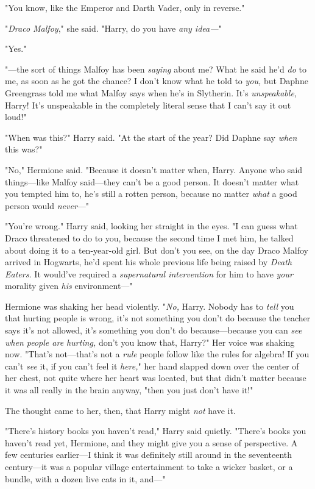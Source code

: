 "You know, like the Emperor and Darth Vader, only in reverse."

"\emph{Draco Malfoy}," she said. "Harry, do you have \emph{any idea---}"

"Yes."

"---the sort of things Malfoy has been \emph{saying} about me? What he said 
he'd \emph{do} to me, as soon as he got the chance? I don't know what he told 
to \emph{you,} but Daphne Greengrass told me what Malfoy says when he's in 
Slytherin. It's \emph{unspeakable,} Harry! It's unspeakable in the completely 
literal sense that I can't say it out loud!"

"When was this?" Harry said. "At the start of the year? Did Daphne say 
\emph{when} this was?"

"No," Hermione said. "Because it doesn't matter when, Harry. Anyone who said 
things---like Malfoy said---they can't be a good person. It doesn't matter what 
you tempted him to, he's still a rotten person, because no matter \emph{what} a 
good person would \emph{never}---"

"You're wrong." Harry said, looking her straight in the eyes. "I can guess what 
Draco threatened to do to you, because the second time I met him, he talked 
about doing it to a ten-year-old girl. But don't you see, on the day Draco 
Malfoy arrived in Hogwarts, he'd spent his whole previous life being raised by 
\emph{Death Eaters.} It would've required a \emph{supernatural intervention} 
for him to have \emph{your} morality given \emph{his} environment---"

Hermione was shaking her head violently. "\emph{No,} Harry. Nobody has to 
\emph{tell} you that hurting people is wrong, it's not something you don't do 
because the teacher says it's not allowed, it's something you don't do 
because---because you can \emph{see when people are hurting,} don't you know 
that, Harry?" Her voice was shaking now. "That's not---that's not a \emph{rule} 
people follow like the rules for algebra! If you can't \emph{see} it, if you 
can't feel it \emph{here,}" her hand slapped down over the center of her chest, 
not quite where her heart was located, but that didn't matter because it was 
all really in the brain anyway, "then you just don't have it!"

The thought came to her, then, that Harry might \emph{not} have it.

"There's history books you haven't read," Harry said quietly. "There's books 
you haven't read yet, Hermione, and they might give you a sense of perspective. 
A few centuries earlier---I think it was definitely still around in the 
seventeenth century---it was a popular village entertainment to take a wicker 
basket, or a bundle, with a dozen live cats in it, and---"

